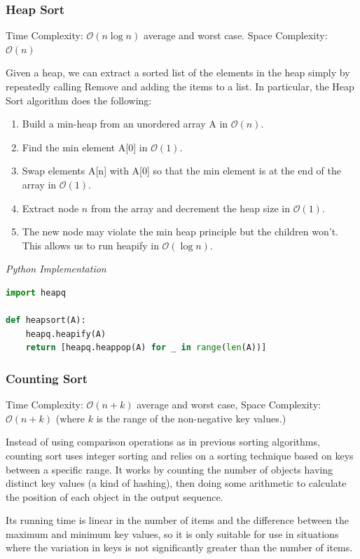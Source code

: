 \documentclass{article}
\newcommand{\bigO}{\mathcal{O}}
\begin{document}
    \subsubsection{Heap Sort}
    Time Complexity: $\bigO(n \log n)$ average and worst case. Space Complexity: $\bigO (n)$
    
    Given a heap, we can extract a sorted list of the elements in the heap simply by repeatedly calling Remove and adding the items to a list. In particular, the Heap Sort algorithm does the following: 
    \begin{enumerate}
        \item Build a min-heap from an unordered array A in $\bigO(n)$.
        \item Find the min element A[0] in $\bigO(1)$.
        \item Swap elements A[n] with A[0] so that the min element is at the end of the array in $\bigO(1)$.
        \item Extract node $n$ from the array and decrement the heap size in $\bigO(1)$.
        \item The new node may violate the min heap principle but the children won't. This allows us to run heapify in $\bigO(\log n)$.
    \end{enumerate}
    
\vspace{8pt} \emph{Python Implementation}
\begin{lstlisting}[language=Python]
import heapq

def heapsort(A):
    heapq.heapify(A)
    return [heapq.heappop(A) for _ in range(len(A))]
\end{lstlisting}

    \subsubsection{Counting Sort}
    Time Complexity: $\bigO(n + k)$ average and worst case, Space Complexity: $\bigO(n + k)$ (where $k$ is the range of the non-negative key values.)
    
    Instead of using comparison operations as in previous sorting algorithms, counting sort uses integer sorting and relies on a sorting technique based on keys between a specific range. It works by counting the number of objects having distinct key values (a kind of hashing), then doing some arithmetic to calculate the position of each object in the output sequence.
    
    Its running time is linear in the number of items and the difference between the maximum and minimum key values, so it is only suitable for use in situations where the variation in keys is not significantly greater than the number of items. 
    
\end{document}
